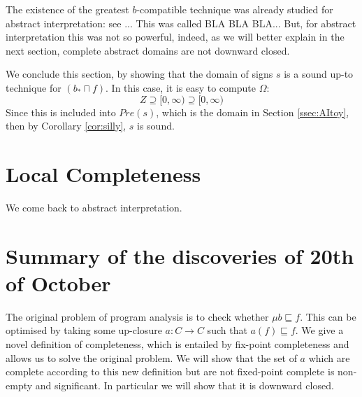 \documentclass{llncs}
\begin{document}



\begin{remark}
The existence of the greatest $b$-compatible technique was already studied for abstract interpretation: see \cite{}... This was called BLA BLA BLA...
But, for abstract interpretation this was not so powerful, indeed, as we will better explain in the next section, complete abstract domains are not downward closed.  
\end{remark}

\medskip

We conclude this section, by showing that the domain of signs $s$ is a sound up-to technique for $(b_*\sqcap f)$. In this case, it is easy to compute $\Omega$: 
\begin{equation*}
Z \supseteq [0,\infty)  \supseteq [0,\infty) 
\end{equation*}
Since this is included into $Pre(s)$, which is the domain in Section \ref{ssec:AItoy}, then by Corollary \ref{cor:silly}, $s$ is sound.


\section{Local Completeness}
We come back to abstract interpretation. 

\section{Summary of the discoveries of 20th of October}
The original problem of program analysis is to check whether $\mu b \sqsubseteq f$. This can be optimised by taking some up-closure $a\colon C \to C$ such that $a(f)\sqsubseteq f$. We give a novel definition of completeness, which is entailed by fix-point completeness and allows us to solve the original problem. We will show that the set of $a$ which are complete according to this new definition but are not fixed-point complete is non-empty and significant. In particular we will show that it is downward closed.
\end{document}
